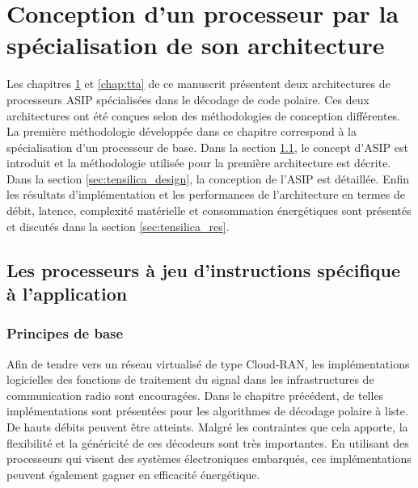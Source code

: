 
\chapter{Conception d'un processeur par la spécialisation de son architecture} %
\label{chap:tensilica}

Les chapitres \ref{chap:tensilica} et \ref{chap:tta} de ce manuscrit présentent deux architectures de processeurs ASIP spécialisées dans le décodage de code polaire. Ces deux architectures ont été conçues selon des méthodologies de conception différentes. La première méthodologie développée dans ce chapitre correspond à la spécialisation d'un processeur de base. Dans la section \ref{sec:asips}, le concept d'ASIP est introduit et la méthodologie utilisée pour la première architecture est décrite. Dans la section \ref{sec:tensilica_design}, la conception de l'ASIP est détaillée. Enfin les résultats d'implémentation et les performances de l'architecture en termes de débit, latence, complexité matérielle et consommation énergétiques sont présentés et discutés dans la section \ref{sec:tensilica_res}.

\vspace*{\fill}
\minitocTITI
\vspace*{\fill}
\newpage

\section{Les processeurs à jeu d'instructions spécifique à l'application}
\label{sec:asips}

\subsection{Principes de base}

Afin de tendre vers un réseau virtualisé de type Cloud-RAN, les implémentations logicielles des fonctions de traitement du signal dans les infrastructures de communication radio sont encouragées. Dans le chapitre précédent, de telles implémentations sont présentées pour les algorithmes de décodage polaire à liste. De hauts débits peuvent être atteints. Malgré les contraintes que cela apporte, la flexibilité et la généricité de ces décodeurs sont très importantes. En utilisant des processeurs qui visent des systèmes électroniques embarqués, ces implémentations peuvent également gagner en efficacité énergétique.

